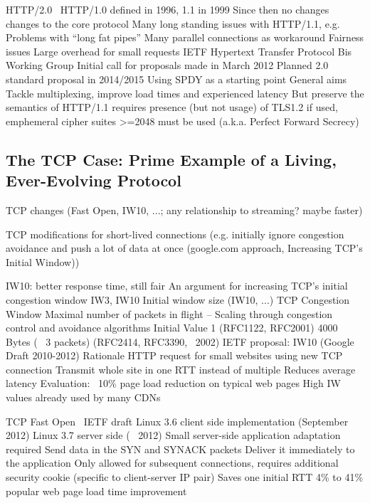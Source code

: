 HTTP/2.0~\cite{http20draft}
 HTTP/1.0 defined in 1996, 1.1 in 1999
	Since then no changes changes to the core protocol
 Many long standing issues with HTTP/1.1, e.g.
	Problems with ``long fat pipes''
		Many parallel connections as workaround
		Fairness issues
	Large overhead for small requests
 IETF Hypertext Transfer Protocol Bis Working Group
 Initial call for proposals made in March 2012
 Planned 2.0 standard proposal in 2014/2015
 Using SPDY as a starting point
 General aims
	Tackle multiplexing, improve load times and experienced latency
	But preserve the semantics of HTTP/1.1
requires presence (but not usage) of TLS1.2
	if used, emphemeral cipher suites >=2048 must be used (a.k.a. Perfect Forward Secrecy)












\subsection{The TCP Case: Prime Example of a Living, Ever-Evolving Protocol}

\gls{TCP} changes (Fast Open, IW10, ...; any relationship to streaming? maybe faster)

TCP modifications for short-lived connections (e.g. initially ignore congestion avoidance and push a lot of data at once (google.com approach, Increasing TCP's Initial Window)) 

IW10: better response time, still fair \cite{rfc6928}
An argument for increasing \gls{TCP}'s initial congestion window \cite{dukkipati2010argument}
IW3, IW10  Initial window size (IW10, ...)
 TCP Congestion Window
	Maximal number of packets in flight
–	Scaling through congestion control and avoidance algorithms
 Initial Value
	1 (RFC1122, RFC2001)
	4000 Bytes (~ 3 packets) (RFC2414, RFC3390, ~2002)
	IETF proposal: IW10 (Google Draft 2010-2012)
 Rationale
	HTTP request for small websites using new TCP connection
	Transmit whole site in one RTT instead of multiple
	Reduces average latency
		Evaluation: ~10\% page load reduction on typical web pages
	High IW values already used by many CDNs



TCP Fast Open~\cite{cheng2014tcptfo}
 IETF draft
 Linux 3.6 client side implementation (September 2012)
 Linux 3.7 server side (~ 2012)
 Small server-side application adaptation required
 Send data in the SYN and SYNACK packets
	Deliver it immediately to the application
	Only allowed for subsequent connections, requires additional security cookie (specific to client-server IP pair)
 Saves one initial RTT
 4\% to 41\% popular web page load time improvement


